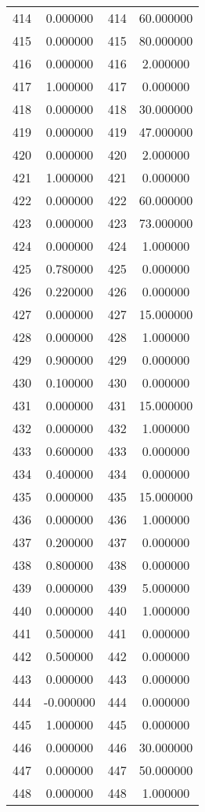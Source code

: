 \documentclass[12pt]{article}
\begin{document}
\begin{longtable}{@{}cccc@{}}
414 & 0.000000 & 414 & 60.000000 \\
415 & 0.000000 & 415 & 80.000000 \\
416 & 0.000000 & 416 & 2.000000 \\
417 & 1.000000 & 417 & 0.000000 \\
418 & 0.000000 & 418 & 30.000000 \\
419 & 0.000000 & 419 & 47.000000 \\
420 & 0.000000 & 420 & 2.000000 \\
421 & 1.000000 & 421 & 0.000000 \\
422 & 0.000000 & 422 & 60.000000 \\
423 & 0.000000 & 423 & 73.000000 \\
424 & 0.000000 & 424 & 1.000000 \\
425 & 0.780000 & 425 & 0.000000 \\
426 & 0.220000 & 426 & 0.000000 \\
427 & 0.000000 & 427 & 15.000000 \\
428 & 0.000000 & 428 & 1.000000 \\
429 & 0.900000 & 429 & 0.000000 \\
430 & 0.100000 & 430 & 0.000000 \\
431 & 0.000000 & 431 & 15.000000 \\
432 & 0.000000 & 432 & 1.000000 \\
433 & 0.600000 & 433 & 0.000000 \\
434 & 0.400000 & 434 & 0.000000 \\
435 & 0.000000 & 435 & 15.000000 \\
436 & 0.000000 & 436 & 1.000000 \\
437 & 0.200000 & 437 & 0.000000 \\
438 & 0.800000 & 438 & 0.000000 \\
439 & 0.000000 & 439 & 5.000000 \\
440 & 0.000000 & 440 & 1.000000 \\
441 & 0.500000 & 441 & 0.000000 \\
442 & 0.500000 & 442 & 0.000000 \\
443 & 0.000000 & 443 & 0.000000 \\
444 & -0.000000 & 444 & 0.000000 \\
445 & 1.000000 & 445 & 0.000000 \\
446 & 0.000000 & 446 & 30.000000 \\
447 & 0.000000 & 447 & 50.000000 \\
448 & 0.000000 & 448 & 1.000000 \\

\end{longtable}
\end{document}
